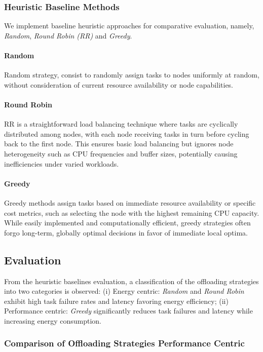 \documentclass[preprint,3p,authoryear]{elsarticle}
\begin{document}
\subsubsection{Heuristic Baseline Methods}
We implement baseline heuristic approaches for comparative evaluation, namely, \emph{Random}, \emph{Round Robin (RR)} and \emph{Greedy}.

\paragraph{Random}
Random strategy, consist to randomly assign tasks to nodes uniformly at random, without consideration of current resource availability or node capabilities.

\paragraph{Round Robin}
RR is a straightforward load balancing technique where tasks are cyclically distributed among nodes, with each node receiving tasks in turn before cycling back to the first node. This ensures basic load balancing but ignores node heterogeneity such as CPU frequencies and buffer sizes, potentially causing inefficiencies under varied workloads. 

\paragraph{Greedy}
Greedy methods assign tasks based on immediate resource availability or specific cost metrics, such as selecting the node with the highest remaining CPU capacity. While easily implemented and computationally efficient, greedy strategies often forgo long-term, globally optimal decisions in favor of immediate local optima.



\subsection{Evaluation}


From the heuristic baselines evaluation, a classification of the offloading strategies into two categories is observed: (i) Energy centric: \emph{Random} and \emph{Round Robin} exhibit high task failure rates and latency favoring energy efficiency; (ii) Performance centric: \emph{Greedy} significantly reduces task failures and latency while increasing energy consumption.

\subsubsection{Comparison of Offloading Strategies Performance Centric}\label{subsec:comparison_of_offloading_strategies}
\end{document}
